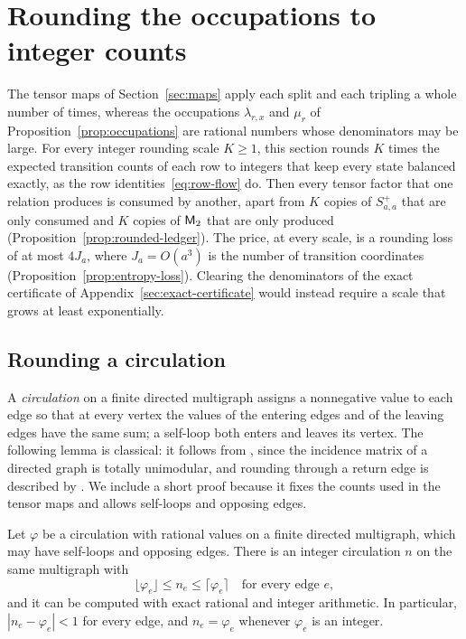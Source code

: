 \section{Rounding the occupations to integer counts}
\label{sec:rounding}

The tensor maps of Section~\ref{sec:maps} apply each split and each tripling
a whole number of times, whereas the occupations \(\lambda_{r,x}\) and
\(\mu_r\) of Proposition~\ref{prop:occupations} are rational numbers whose
denominators may be large. For every integer rounding scale \(K\ge1\), this
section rounds \(K\) times the expected transition counts of each row to
integers that keep every state balanced exactly, as the row
identities~\eqref{eq:row-flow} do. Then
every tensor factor that one relation produces is consumed by another, apart
from \(K\) copies of \(S^+_{a,a}\) that are only consumed and \(K\) copies of
\(\mathsf M_2\) that are only produced (Proposition~\ref{prop:rounded-ledger}). The
price, at every scale, is a rounding loss of at most \(4J_a\), where
\(J_a=O(a^3)\) is the number of transition coordinates
(Proposition~\ref{prop:entropy-loss}). Clearing the denominators of the exact
certificate of Appendix~\ref{sec:exact-certificate} would instead require a
scale that grows at least exponentially.

\subsection{Rounding a circulation}
\label{subsec:circulation-rounding}

A \emph{circulation} on a finite directed multigraph assigns a nonnegative
value to each edge so that at every vertex the values of the entering edges
and of the leaving edges have the same sum; a self-loop both enters and
leaves its vertex. The following lemma is classical: it follows from
\citet[Theorem~2]{HK56}, since the incidence matrix of a directed graph is
totally unimodular, and rounding through a return edge is described by
\citet[Sections~2.2--3.1]{KangPayor15}. We include a short proof because it
fixes the counts used in the tensor maps and allows self-loops and opposing
edges.

\begin{lemma}\label{lem:circulation-rounding}
Let \(\varphi\) be a circulation with rational values on a finite directed
multigraph, which may have self-loops and opposing edges. There is an
integer circulation \(n\) on the same multigraph with
\[
 \lfloor\varphi_e\rfloor\le n_e\le\lceil\varphi_e\rceil
 \quad\text{for every edge }e,
\]
and it can be computed with exact rational and integer arithmetic. In
particular, \(|n_e-\varphi_e|<1\) for every edge, and
\(n_e=\varphi_e\) whenever \(\varphi_e\) is an integer.
\end{lemma}

